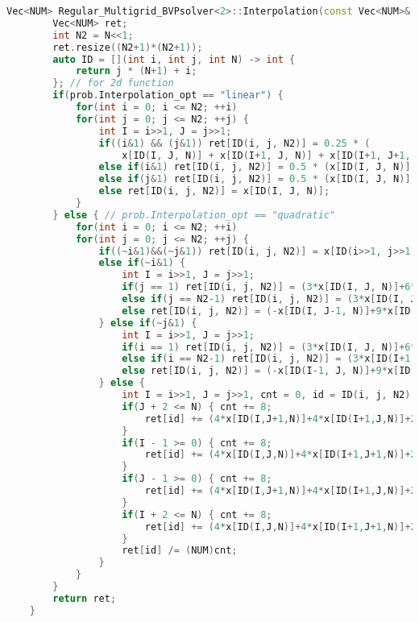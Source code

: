 \documentclass[lang=cn,a4paper,newtx,bibend=bibtex]{elegantpaper}
\begin{document}
\begin{lstlisting}[language=C++]
  Vec<NUM> Regular_Multigrid_BVPsolver<2>::Interpolation(const Vec<NUM>& x, const int N) {
        Vec<NUM> ret;
        int N2 = N<<1;
        ret.resize((N2+1)*(N2+1));
        auto ID = [](int i, int j, int N) -> int { 
            return j * (N+1) + i; 
        }; // for 2d function
        if(prob.Interpolation_opt == "linear") {
            for(int i = 0; i <= N2; ++i)
            for(int j = 0; j <= N2; ++j) {
                int I = i>>1, J = j>>1;
                if((i&1) && (j&1)) ret[ID(i, j, N2)] = 0.25 * (
                    x[ID(I, J, N)] + x[ID(I+1, J, N)] + x[ID(I+1, J+1, N)] + x[ID(I, J+1, N)]);
                else if(i&1) ret[ID(i, j, N2)] = 0.5 * (x[ID(I, J, N)] + x[ID(I+1, J, N)]);
                else if(j&1) ret[ID(i, j, N2)] = 0.5 * (x[ID(I, J, N)] + x[ID(I, J+1, N)]);
                else ret[ID(i, j, N2)] = x[ID(I, J, N)];
            }
        } else { // prob.Interpolation_opt == "quadratic"
            for(int i = 0; i <= N2; ++i)
            for(int j = 0; j <= N2; ++j) {
                if((~i&1)&&(~j&1)) ret[ID(i, j, N2)] = x[ID(i>>1, j>>1, N)];
                else if(~i&1) {
                    int I = i>>1, J = j>>1;
                    if(j == 1) ret[ID(i, j, N2)] = (3*x[ID(I, J, N)]+6*x[ID(I, J+1, N)]-x[ID(I, J+2, N)])/8.0;
                    else if(j == N2-1) ret[ID(i, j, N2)] = (3*x[ID(I, J+1, N)]+6*x[ID(I, J, N)]-x[ID(I, J-1, N)])/8.0;
                    else ret[ID(i, j, N2)] = (-x[ID(I, J-1, N)]+9*x[ID(I, J, N)]+9*x[ID(I, J+1, N)]-x[ID(I, J+2, N)])/16.0;
                } else if(~j&1) {
                    int I = i>>1, J = j>>1;
                    if(i == 1) ret[ID(i, j, N2)] = (3*x[ID(I, J, N)]+6*x[ID(I+1, J, N)]-x[ID(I+2, J, N)])/8.0;
                    else if(i == N2-1) ret[ID(i, j, N2)] = (3*x[ID(I+1, J, N)]+6*x[ID(I, J, N)]-x[ID(I-1, J, N)])/8.0;
                    else ret[ID(i, j, N2)] = (-x[ID(I-1, J, N)]+9*x[ID(I, J, N)]+9*x[ID(I+1, J, N)]-x[ID(I+2, J, N)])/16.0;
                } else {
                    int I = i>>1, J = j>>1, cnt = 0, id = ID(i, j, N2);
                    if(J + 2 <= N) { cnt += 8;
                        ret[id] += (4*x[ID(I,J+1,N)]+4*x[ID(I+1,J,N)]+2*x[ID(I+1,J+1,N)]-x[ID(I,J+2,N)]-x[ID(I+1,J+2,N)]);
                    }
                    if(I - 1 >= 0) { cnt += 8;
                        ret[id] += (4*x[ID(I,J,N)]+4*x[ID(I+1,J+1,N)]+2*x[ID(I,J+1,N)]-x[ID(I-1,J,N)]-x[ID(I-1,J+1,N)]);
                    }
                    if(J - 1 >= 0) { cnt += 8;
                        ret[id] += (4*x[ID(I,J+1,N)]+4*x[ID(I+1,J,N)]+2*x[ID(I,J,N)]-x[ID(I,J-1,N)]-x[ID(I+1,J-1,N)]);
                    }
                    if(I + 2 <= N) { cnt += 8;
                        ret[id] += (4*x[ID(I,J,N)]+4*x[ID(I+1,J+1,N)]+2*x[ID(I+1,J,N)]-x[ID(I+2,J,N)]-x[ID(I+2,J+1,N)]);
                    }
                    ret[id] /= (NUM)cnt;
                }
            }
        }
        return ret;
    }
\end{lstlisting}
\end{document}
